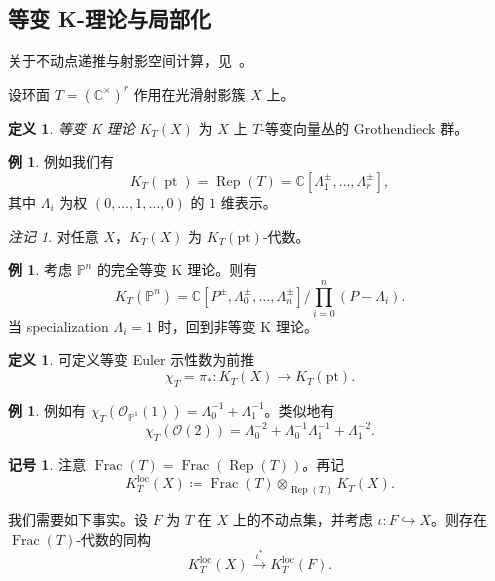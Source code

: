 \documentclass{amsart}
\theoremstyle{definition}
\newtheorem{defn}[thm]{定义}
\newtheorem{exm}[thm]{例}
\newtheorem{notn}[thm]{记号}
\theoremstyle{remark}
\newtheorem{rmk}[thm]{注记}
\theoremstyle{plain}
\theoremstyle{definition}
\theoremstyle{remark}
\newcommand{\C}{\mathbb{C}}
\renewcommand{\P}{\mathbb{P}}
\newcommand{\mc}[1]{\mathcal{#1}}
\newcommand{\mr}[1]{\mathrm{#1}}
\newcommand{\on}[1]{\operatorname{#1}}
\newcommand{\1}{\mathbf{1}}
\newcommand{\2}{\mathbf{2}}
\newcommand{\3}{\mathbf{3}}
\newcommand{\loc}{\mr{loc}}
\begin{document}
\subsection{等变 K-理论与局部化}%
\label{sub:Equivariant K-theory and localization}

关于不动点递推与射影空间计算，见~\cite{GiventalK2}。

设环面 \(T = (\C^{\times})^r\) 作用在光滑射影簇 \(X\) 上。

\begin{defn}
    \textit{等变 K 理论} \(K_T(X)\) 为 \(X\) 上 \(T\)-等变向量丛的 Grothendieck 群。
\end{defn}

\begin{exm}
    例如我们有
    \[ K_T(\on{pt}) = \on{Rep}(T) = \C[\Lambda_1^{\pm}, \ldots, \Lambda_r^{\pm}], \]
    其中 \(\Lambda_i\) 为权 \((0, \ldots, 1, \ldots, 0)\) 的 \(1\) 维表示。
\end{exm}

\begin{rmk}
    对任意 \(X\)，\(K_T(X)\) 为 \(K_T(\mr{pt})\)-代数。
\end{rmk}

\begin{exm}
    考虑 \(\P^n\) 的完全等变 K 理论。则有
    \[ K_T(\P^n) = \C[P^{\pm}, \Lambda_0^{\pm}, \ldots, \Lambda_n^{\pm}] \big/ \prod_{i=0}^n (P-\Lambda_i). \]
    当 specialization \(\Lambda_i = 1\) 时，回到非等变 K 理论。
\end{exm}

\begin{defn}
    可定义等变 Euler 示性数为前推
    \[ \chi_T = \pi_* \colon K_T(X) \to K_T(\mr{pt}). \]
\end{defn}

\begin{exm}
    例如有 \(\chi_T(\mc{O}_{\P^1}(1)) = \Lambda_0^{-1} + \Lambda_1^{-1}\)。类似地有
    \[ \chi_T(\mc{O}(2)) = \Lambda_0^{-2} + \Lambda_0^{-1} \Lambda_1^{-1} + \Lambda_1^{-2}. \]
\end{exm}

\begin{notn}
    注意 \(\on{Frac}(T) = \on{Frac}(\on{Rep}(T))\)。再记
    \[ K_T^{\loc}(X) \coloneqq \on{Frac}(T) \otimes_{\on{Rep}(T)} K_T(X). \]
\end{notn}

我们需要如下事实。设 \(F\) 为 \(T\) 在 \(X\) 上的不动点集，并考虑 \(\iota \colon F \hookrightarrow X\)。则存在 \(\on{Frac}(T)\)-代数的同构
\[ K_T^{\loc}(X) \xrightarrow{\iota^*} K_T^{\loc}(F). \]
\end{document}

